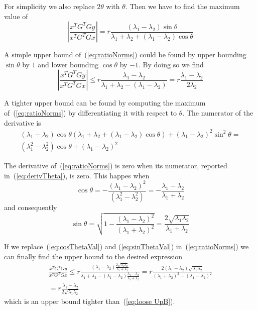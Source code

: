 \documentclass[12pt,draftcls,onecolumn]{IEEEtran} %
\begin{document}
For simplicity we also replace $2\theta$ with $\theta$. Then we have
to find the maximum value of
\begin{equation}
  \label{eq:ratioNorms}
  \left|\frac{x^TG^TGy}{x^TG^TGx}\right|
  =r\frac{(\lambda_1-\lambda_2)\sin\theta}
  {\lambda_1+\lambda_2+(\lambda_1-\lambda_2)\cos\theta}
\end{equation}

A simple upper bound of~(\ref{eq:ratioNorms}) could be found by upper
bounding $\sin\theta$ by $1$ and lower bounding $\cos\theta$ by
$-1$. By doing so we find
\begin{equation}
  \label{eq:loose UpB}
  \left|\frac{x^TG^TGy}{x^TG^TGx}\right|\leq
  r\frac{\lambda_1-\lambda_2}
  {\lambda_1+\lambda_2-(\lambda_1-\lambda_2)}
  =r\frac{\lambda_1-\lambda_2}{2\lambda_2}
\end{equation}

A tighter upper bound can be found by computing the maximum
of~(\ref{eq:ratioNorms}) by differentiating it with respect to
$\theta$. The numerator of the derivative is
\begin{multline}
  \label{eq:derivTheta}
  (\lambda_1-\lambda_2)\cos\theta(\lambda_1+\lambda_2+(\lambda_1-\lambda_2)\cos\theta)
  +(\lambda_1-\lambda_2)^2\sin^2\theta = \\
  (\lambda_1^2-\lambda_2^2)\cos\theta+(\lambda_1-\lambda_2)^2
\end{multline}

The derivative of~(\ref{eq:ratioNorms}) is zero when its numerator,
reported in~(\ref{eq:derivTheta}), is zero. This happes when
\begin{equation}
  \label{eq:cosThetaVal}
  \cos\theta=-\frac{(\lambda_1-\lambda_2)^2}{(\lambda_1^2-\lambda_2^2)}
  =-\frac{\lambda_1-\lambda_2}{\lambda_1+\lambda_2}
\end{equation}
and consequently
\begin{equation}
  \label{eq:sinThetaVal}
  \sin\theta=\sqrt{1-\frac{(\lambda_1-\lambda_2)^2}{(\lambda_1+\lambda_2)^2}}
  =\frac{2\sqrt{\lambda_1\lambda_2}}{\lambda_1+\lambda_2}
\end{equation}

If we replace~(\ref{eq:cosThetaVal}) and (\ref{eq:sinThetaVal})
in~(\ref{eq:ratioNorms}) we can finally find the upper bound to the
desired expression
\begin{multline}
  \label{eq:upBound1stPiece}
  \frac{x^TG^TGy}{x^TG^TGx}\leq
  r\frac{(\lambda_1-\lambda_2)\frac{2\sqrt{\lambda_1\lambda_2}}{\lambda_1+\lambda_2}}
  {\lambda_1+\lambda_2-(\lambda_1-\lambda_2)\frac{\lambda_1-\lambda_2}{\lambda_1+\lambda_2}}=
  r\frac{2(\lambda_1-\lambda_2)\sqrt{\lambda_1\lambda_2}}
  {(\lambda_1+\lambda_2)^2-(\lambda_1-\lambda_2)^2}\\
  = r\frac{\lambda_1-\lambda_2}{2\sqrt{\lambda_1\lambda_2}}
\end{multline}
which is an upper bound tighter than~(\ref{eq:loose UpB}).
\end{document}

